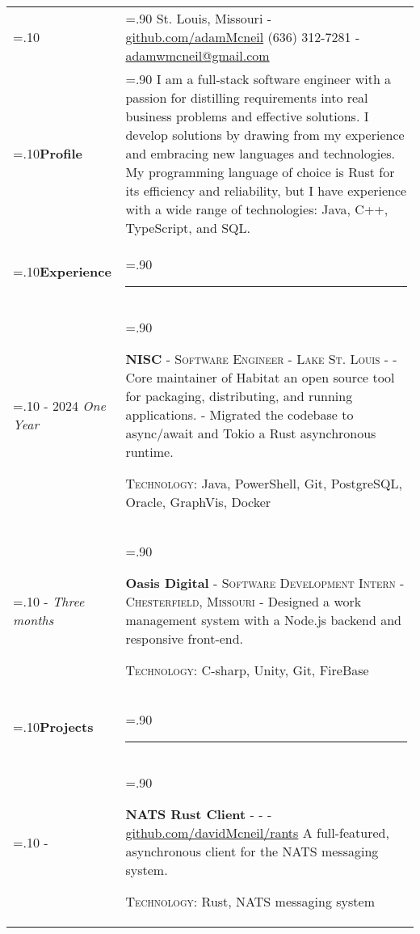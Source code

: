 \documentclass[10pt]{article}
\newcommand{\timeFrame}[3] {
  \if\relax\detokenize{#2}\relax
    #1
  \else
    #1 - #2
  \fi
  \newline
  \scriptsize \textit{#3}
}
\newcommand{\entry}[6] {
  \textbf{#1}
  \if\relax\detokenize{#2}\relax
  \else
       - \textsc{#2}
  \fi
  \if\relax\detokenize{#3}\relax
  \else
      - \textsc{#3}
  \fi
  \if\relax\detokenize{#4}\relax
  \else
      - \href{https://#4}{#4}
  \fi
  \newline #5
  \if\relax\detokenize{#6}\relax
  \else
      \newline \textsc{Technology:} #6
  \fi
  \\
}
\newcommand{\horizontalLine}[0] {
    \noindent\rule{.90\linewidth}{0.4pt}
}
\begin{document}

\begin{tabularx}{\linewidth}{>{\hsize=.10\hsize}X>{\hsize=.90\hsize}X}

{\bfseries\large Adam McNeil} &
St. Louis, Missouri - \href{https://github.com/adamMcneil}{github.com/adamMcneil}\newline
{(636) 312-7281 \hspace{5.5mm} - \href{mailto:adamwmcneil@gmail.com}{adamwmcneil@gmail.com}} \\[5pt]

\textbf{Profile} &
{I am a full-stack software engineer with a passion for distilling requirements into real business problems and effective solutions. I develop solutions by drawing from my experience and embracing new languages and technologies. My programming language of choice is Rust for its efficiency and reliability, but I have experience with a wide range of technologies: Java, C++, TypeScript, and SQL.
} \\

\textbf{Experience} & \horizontalLine \\

\timeFrame{2023}{2024}{One Year} &
\entry{NISC}
  {Software Engineer}
  {Lake St. Louis}
  {}
  {
  - Core maintainer of Habitat an open source tool for packaging, distributing, and running applications. \newline
  - Migrated the codebase to async/await and Tokio a Rust asynchronous runtime.
  }
  {Java, PowerShell, Git, PostgreSQL, Oracle, GraphVis, Docker}

\timeFrame{2022}{}{Three months} &
\entry{Oasis Digital}
  {Software Development Intern}
  {Chesterfield, Missouri}
  {}
  {
  Designed a work management system with a Node.js backend and responsive front-end.
  }
  {C-sharp, Unity, Git, FireBase}


\textbf{Projects} & \horizontalLine \\


\timeFrame{2019}{}{} &
\entry{NATS Rust Client}
  {}
  {}
  {github.com/davidMcneil/rants}
  {
  A full-featured, asynchronous client for the NATS messaging system.
  }
  {Rust, NATS messaging system}


\end{tabularx}
\end{document}
